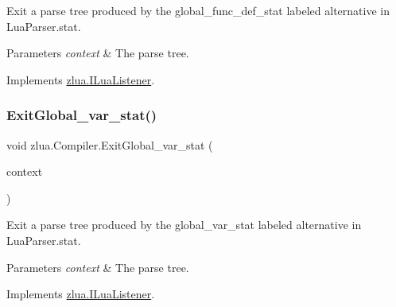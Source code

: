 Exit a parse tree produced by the {\ttfamily global\+\_\+func\+\_\+def\+\_\+stat} labeled alternative in Lua\+Parser.\+stat. 


\begin{DoxyParams}{Parameters}
{\em context} & The parse tree.\\
\hline
\end{DoxyParams}


Implements \mbox{\hyperlink{interfacezlua_1_1_i_lua_listener_a13e62813408bab9b10861e768a3c5ca1}{zlua.\+I\+Lua\+Listener}}.

\mbox{\label{classzlua_1_1_compiler_a6c1f448ee93660853921f2c0048bc173}} 
\subsubsection{\texorpdfstring{Exit\+Global\+\_\+var\+\_\+stat()}{ExitGlobal\_var\_stat()}}
{\footnotesize\ttfamily void zlua.\+Compiler.\+Exit\+Global\+\_\+var\+\_\+stat (\begin{DoxyParamCaption}\item[{\mbox{[}\+Not\+Null\mbox{]} \mbox{\hyperlink{classzlua_1_1_lua_parser_1_1_global__var__stat_context}{Lua\+Parser.\+Global\+\_\+var\+\_\+stat\+Context}}}]{context }\end{DoxyParamCaption})}



Exit a parse tree produced by the {\ttfamily global\+\_\+var\+\_\+stat} labeled alternative in Lua\+Parser.\+stat. 


\begin{DoxyParams}{Parameters}
{\em context} & The parse tree.\\
\hline
\end{DoxyParams}


Implements \mbox{\hyperlink{interfacezlua_1_1_i_lua_listener_a4e14ac8afc7b39056fc78c89ac3ba8fa}{zlua.\+I\+Lua\+Listener}}.

\mbox{\label{classzlua_1_1_compiler_afca7da08ee84a7b0797de722420b443a}} 
